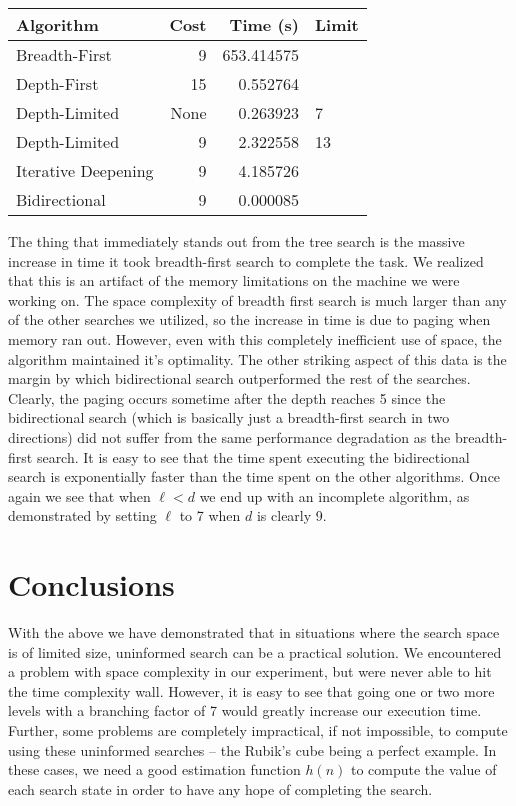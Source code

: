 \documentclass[a4paper,11pt]{report}
\begin{document}
\begin{tabular}{ | l | r | r | l | }
  \hline
  Algorithm & Cost & Time (s) & Limit \\ \hline
  Breadth-First & 9 & 653.414575 & \\
  Depth-First & 15 & 0.552764 & \\
  Depth-Limited & None & 0.263923 &  7 \\
  Depth-Limited & 9 & 2.322558 & 13 \\
  Iterative Deepening & 9 & 4.185726 & \\
  Bidirectional & 9 & 0.000085 & \\
  \hline
\end{tabular}
\vspace{5 mm}

The thing that immediately stands out from the tree search is the massive
increase in time it took breadth-first search to complete the task. We realized
that this is an artifact of the memory limitations on the machine we were
working on.  The space complexity of breadth first search is much larger than
any of the other searches we utilized, so the increase in time is due to paging
when memory ran out.  However, even with this completely inefficient use of
space, the algorithm maintained it's optimality.\newline
\indent The other striking aspect of this data is the margin by which
bidirectional search outperformed the rest of the searches. Clearly, the paging
occurs sometime after the depth reaches 5 since the bidirectional search (which
is basically just a breadth-first search in two directions) did not suffer from
the same performance degradation as the breadth-first search.  It is easy to see
that the time spent executing the bidirectional search is exponentially faster
than the time spent on the other algorithms.\newline
\indent Once again we see that when $\ell < d$ we end up with an incomplete
algorithm, as demonstrated by setting $\ell$ to 7 when $d$ is clearly 9.

\section{Conclusions}
With the above we have demonstrated that in situations where the search space is
of limited size, uninformed search can be a practical solution.  We encountered
a problem with space complexity in our experiment, but were never able to hit
the time complexity wall.  However, it is easy to see that going one or two more
levels with a branching factor of 7 would greatly increase our execution time.
Further, some problems are completely impractical, if not impossible, to compute
using these uninformed searches -- the Rubik's cube being a perfect example.  In
these cases, we need a good estimation function $h(n)$ to compute the value of
each search state in order to have any hope of completing the search.
\end{document}

